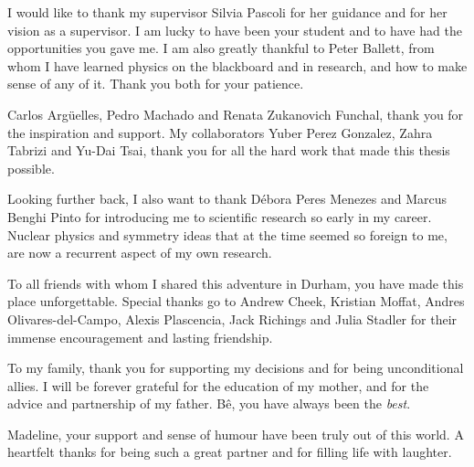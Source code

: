 \documentclass[openany,twoside,frontopenright,openright]{ip3thesis}
\begin{document}
\begin{acknowledgements*}

	I would like to thank my supervisor Silvia Pascoli for her guidance and for her vision as a supervisor. I am lucky to have been your student and to have had the opportunities you gave me. I am also greatly thankful to Peter Ballett, from whom I have learned physics on the blackboard and in research, and how to make sense of any of it. Thank you both for your patience.
	
	\vspace{2ex}
	Carlos Arg\"uelles, Pedro Machado and Renata Zukanovich Funchal, thank you for the inspiration and support. My collaborators Yuber Perez Gonzalez, Zahra Tabrizi and Yu-Dai Tsai, thank you for all the hard work that made this thesis possible.
	
	  \vspace{2ex}
	Looking further back, I also want to thank D\'ebora Peres Menezes and Marcus Benghi Pinto for introducing me to scientific research so early in my career. Nuclear physics and symmetry ideas that at the time seemed so foreign to me, are now a recurrent aspect of my own research.
	
	\vspace{2ex}	
	To all friends with whom I shared this adventure in Durham, you have made this place unforgettable. Special thanks go to Andrew Cheek, Kristian Moffat, Andres Olivares-del-Campo, Alexis Plascencia, Jack Richings and Julia Stadler for their immense encouragement and lasting friendship.

	\vspace{2ex}
	To my family, thank you for supporting my decisions and for being unconditional allies. I will be forever grateful for the education of my mother, and for the advice and partnership of my father. B\^e, you have always been the \emph{best}.
	
	\vspace{2ex}
	Madeline, your support and sense of humour have been truly out of this world. A heartfelt thanks for being such a great partner and for filling life with laughter.
	
\end{acknowledgements*}


\cleardoublepage
\end{document}
